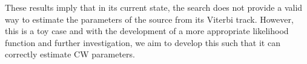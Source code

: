 These results imply that in its current state, the search does not provide a
valid way to estimate the parameters of the source from its Viterbi track.
However, this is a toy case and with the development of a more appropriate likelihood function and
further investigation, we aim to develop this such that it can correctly
estimate \gls{CW} parameters.



















